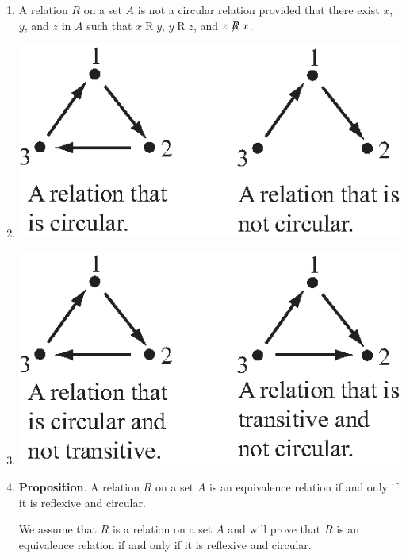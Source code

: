 \documentclass[11pt]{article}
\begin{document}
\begin{enumerate}
  \item A relation $R$ on a set $A$ is not a circular relation provided that there exist $x$, $y$, and $z$ in $A$ such that $x \mathrel{R} y$, $y \mathrel{R} z$, and $z \not\mathrel{R} x$.  
  \item \qquad

\begin{center}
\includegraphics{fig-sec72-1.eps}
\end{center}
  
\item \qquad

\begin{center}
\includegraphics{fig-sec72-2.eps}
\end{center}

\item \textbf{Proposition}.  A relation $R$ on a set $A$ is an equivalence relation if and only if it is reflexive and circular.

\begin{myproof}
We assume that $R$ is a relation on a set $A$ and will prove that $R$ is an equivalence relation if and only if it is reflexive and circular.  


\end{myproof}
\end{enumerate}
\end{document}
